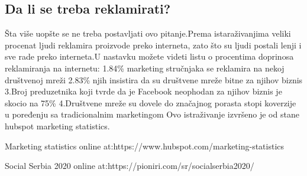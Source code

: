 \documentclass[a4paper]{article}
\begin{document}
	\subsection{Da li se treba reklamirati?}
	\label{subsec:potrebna_reklama}
		Šta više uopšte se ne treba postavljati ovo pitanje.Prema istaraživanjima veliki procenat ljudi reklamira proizvode preko interneta, zato što su ljudi postali lenji i sve rade preko interneta.U nastavku možete videti listu o procentima doprinosa reklamiranja na internetu:
		1.84\% marketing stručnjaka se reklamira na nekoj društvenoj mreži
		2.83\% njih insistira da su društvene mreže bitne za njihov biznis
		3.Broj preduzetnika koji tvrde da je Facebook neophodan za njihov biznis je skocio na 75\%
		4.Društvene mreže su dovele do značajnog porasta stopi koverzije u poređenju sa tradicionalnim marketingom 
		Ovo istraživanje izvršeno je od stane hubspot marketing statistics.
		
		
		\appendix
		

		
		\begin{thebibliography}{9}
			
		 Marketing statistics online at:https://www.hubspot.com/marketing-statistics
		
		 Social Serbia 2020 online at:https://pioniri.com/sr/socialserbia2020/
			
		\end{thebibliography}
		
		
		\appendix
\end{document}
